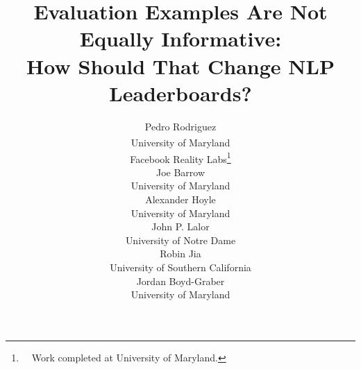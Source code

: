 \documentclass[11pt,a4paper]{article}
\title{Evaluation Examples Are Not Equally Informative:\\How Should That Change NLP Leaderboards?}
\author{
 Pedro Rodriguez \\
University of Maryland\textsuperscript{\terp{}}\\
Facebook Reality Labs\thanks{\ \ Work completed at University of Maryland.}\\
\emaillink{me@pedro.ai}
\And
Joe Barrow\\
University of Maryland\sterp{}\\
\emaillink{jdbarrow@cs.umd.edu}
\And
Alexander Hoyle\\
University of Maryland\sterp{}\\
\emaillink{hoyle@umd.edu}
\AND
John P. Lalor\\
University of Notre Dame\\
\emaillink{john.lalor@nd.edu}
\And
Robin Jia\\
University of Southern California\\
\emaillink{robinjia@usc.edu}
 \And
Jordan Boyd-Graber\\
University of Maryland\sterp{}\\ 
\emaillink{jbg@umiacs.umd.edu}
}
\date{}
\begin{document}
\maketitle
\setlength{\abovedisplayskip}{3pt}
\setlength{\belowdisplayskip}{3pt}

\begin{abstract}
    
\end{abstract}













\clearpage
\begin{appendix}
    
\end{appendix}
\end{document}
